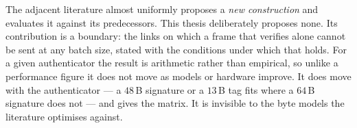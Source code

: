 The adjacent literature almost uniformly proposes a \emph{new construction} and evaluates it
against its predecessors. This thesis deliberately proposes none. Its contribution is a boundary:
the links on which a frame that verifies alone cannot be sent at any batch size, stated with the
conditions under which that holds. For a given authenticator the result is arithmetic rather
than empirical, so unlike a performance figure it does not move as models or hardware improve. It
does move with the authenticator --- a $48$\,B signature or a $13$\,B tag fits where a $64$\,B
signature does not --- and  gives the matrix. It is invisible to the byte
models the literature optimises against.

